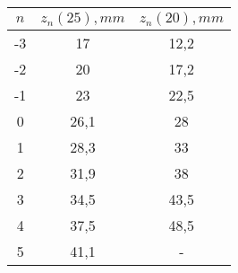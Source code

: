 \begin{tabular}{| c | c | c |}
\hline
$n$ & $z_n (25), mm$ & $z_n (20), mm$\\
\hline
-3 & 17 & 12,2\\
\hline
-2 & 20 & 17,2\\
\hline
-1 & 23 & 22,5\\
\hline
0 & 26,1 & 28\\
\hline
1 & 28,3 & 33\\
\hline
2 & 31,9 & 38\\
\hline
3 & 34,5 & 43,5\\
\hline
4 & 37,5 & 48,5\\
\hline
5 & 41,1 & -\\
\hline
\end{tabular}
